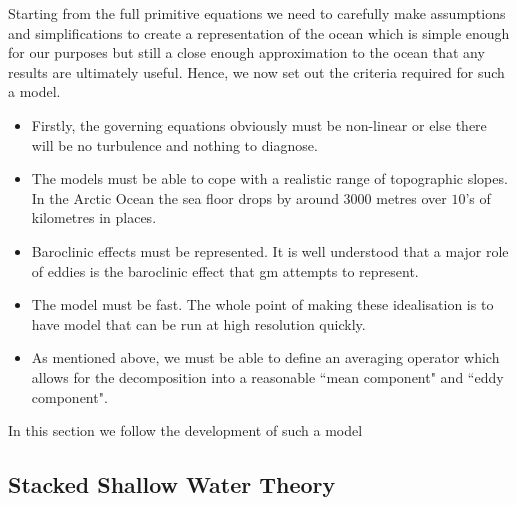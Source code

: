 \documentclass[10pt,a4paper]{article}
\begin{document}
Starting from the full primitive equations we need to carefully make assumptions and
simplifications to create a representation of the ocean which is simple enough for our
purposes but still a close enough approximation to the ocean that any results are ultimately
 useful. Hence, we now set out the criteria required for such a model.
 \begin{itemize}
 	\item Firstly, the governing equations obviously must be non-linear or else there will be
 	no turbulence and nothing to diagnose.
 	\item The models must be able to cope with a realistic range of topographic slopes.
 	In the Arctic Ocean the sea floor drops by around $3000$ metres over $10$'s of kilometres
 	in places.
 	\item Baroclinic effects must be represented. It is well understood that a major role
 	of eddies is the baroclinic effect that \gls{gm} attempts to represent.
 	\item The model must be fast. The whole point of making these idealisation is to have model
 	 that can be run at high resolution quickly.
 	 \item As mentioned above, we must be able to define an averaging operator which 
 	 allows for the decomposition into a reasonable ``mean component" and ``eddy component".
 \end{itemize}
In this section we follow the development of such a model 


\subsection{Stacked Shallow Water Theory}
\end{document}
